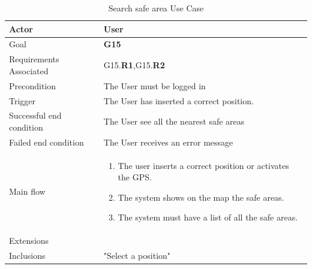 \newline
\begin{table}[htb]
\begin{center}
\renewcommand{\arraystretch}{1.5}
\begin{tabular}{|l|p{}|}
\hline
Actor & User \\ \hline
Goal & \textbf{G15} \\ \hline
Requirements Associated & G15.\textbf{R1},G15.\textbf{R2} \\ \hline
Precondition & The User must be logged in \\ \hline
Trigger & The User has inserted a correct position. \\ \hline
Successful end condition & The User see all the nearest safe areas \\ \hline
Failed end condition & The User receives an error message \\ \hline
Main flow & \begin{minipage}[t]{0.6\textwidth}
\begin{enumerate}
\addtolength{\itemindent}{0.5cm}
\item The user inserts a correct position or activates the GPS.
\item The system shows on the map the safe areas.
\item The system must have a list of all the safe areas.
\vspace{2,5mm}
\end{enumerate}
\end{minipage} \\ \hline
Extensions & \\ \hline
Inclusions & "Select a position" \\ \hline
\end{tabular}
\caption{Search safe area Use Case}
\end{center}
\end{table}
\clearpage

